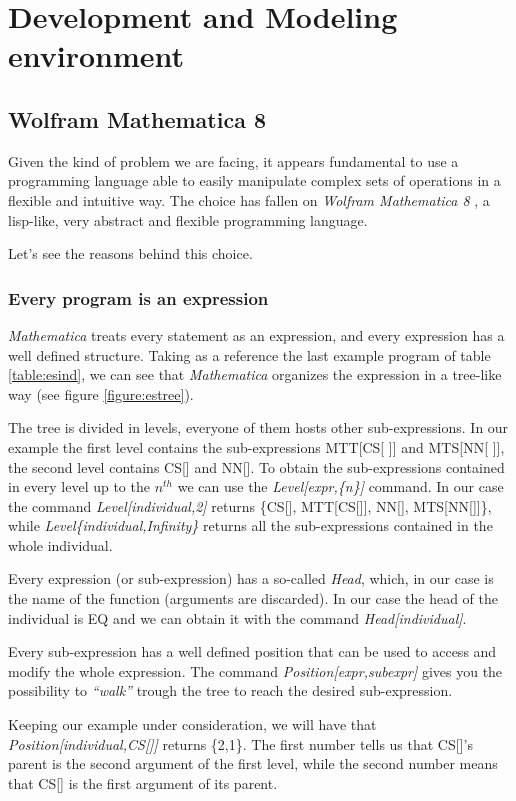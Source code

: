 \documentclass[12pt, a4paper]{article}
\begin{document}
\section{Development and Modeling environment}
\subsection{Wolfram Mathematica 8}
Given the kind of problem we are facing, it appears fundamental to use a programming language able to easily manipulate complex sets of operations in a flexible and intuitive way.
The choice has fallen on {\itshape Wolfram Mathematica 8} \cite{mathematica8}, a lisp-like, very abstract and flexible programming language.

Let's see the reasons behind this choice.

\subsubsection{Every program is an expression}
\label{sec:tree}
\textit{Mathematica} treats every statement as an expression, and every expression has a well defined structure.
Taking as a reference the last example program of table \ref{table:esind}, we can see that \textit{Mathematica} organizes the expression in a tree-like way (see figure \ref{figure:estree}).

The tree is divided in levels, everyone of them hosts other sub-expressions. In our example the first level contains the sub-expressions MTT[CS[ ]] and  MTS[NN[ ]], the second level contains CS[] and NN[]. To obtain the sub-expressions contained in every level  up to the $n^{th}$ we can use the \textit{Level[expr,\{n\}]} command. In our case the command \textit{Level[individual,2]}  returns \{CS[], MTT[CS[]], NN[], MTS[NN[]]\}, while \textit{Level\{individual,Infinity\}} returns all the sub-expressions contained in the whole individual.

Every expression (or sub-expression) has a so-called \textit{Head}, which, in our case is the name of the function (arguments are discarded). In our case the head of the individual is EQ and we can obtain it with the command \textit{Head[individual]}.

Every sub-expression has a well defined position that can be used to access and modify the whole expression. The command \textit{Position[expr,subexpr]} gives you the possibility to \textit{``walk''} trough the tree to reach the desired sub-expression.

Keeping our example under consideration, we will have that \textit{Position[individual,CS[]]} returns \{2,1\}. The first number tells us that CS[]'s parent is the second argument of the first level, while the second number means that CS[] is the first argument of its parent.
\end{document}
